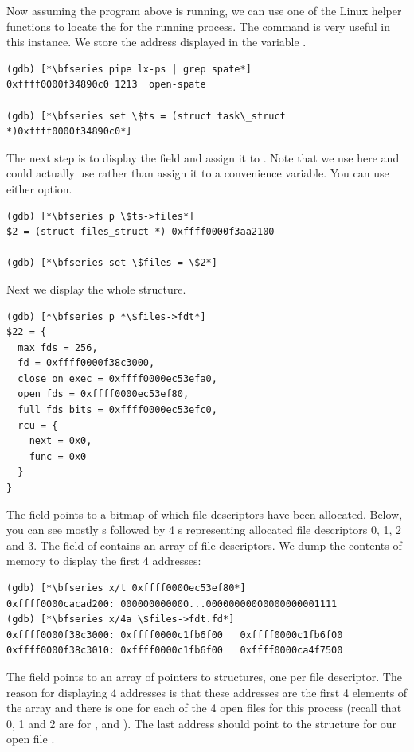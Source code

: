 Now assuming the program above is running, we can use one of the Linux helper functions to locate the  for the running process. The  command is very useful in this instance. We store the address displayed in the variable .

\begin{lstlisting}
(gdb) [*\bfseries pipe lx-ps | grep spate*]
0xffff0000f34890c0 1213  open-spate

(gdb) [*\bfseries set \$ts = (struct task\_struct *)0xffff0000f34890c0*]
\end{lstlisting}

\noindent
The next step is to display the  field and assign it to . Note that we use  here and could actually use  rather than assign it to a convenience variable. You can use either option.

\begin{lstlisting}
(gdb) [*\bfseries p \$ts->files*]
$2 = (struct files_struct *) 0xffff0000f3aa2100

(gdb) [*\bfseries set \$files = \$2*]
\end{lstlisting}

\noindent
Next we display the whole  structure. 

\begin{lstlisting}
(gdb) [*\bfseries p *\$files->fdt*]
$22 = {
  max_fds = 256,
  fd = 0xffff0000f38c3000,
  close_on_exec = 0xffff0000ec53efa0,
  open_fds = 0xffff0000ec53ef80,
  full_fds_bits = 0xffff0000ec53efc0,
  rcu = {
    next = 0x0,
    func = 0x0
  }
}
\end{lstlisting}

\noindent
The  field points to a bitmap of which file descriptors have been allocated. Below, you can see mostly s followed by 4 s representing allocated file descriptors 0, 1, 2 and 3. The  field of  contains an array of file descriptors.  We dump the contents of memory to display the first 4 addresses:

\begin{lstlisting}
(gdb) [*\bfseries x/t 0xffff0000ec53ef80*]
0xffff0000cacad200:	000000000000...00000000000000000001111
(gdb) [*\bfseries x/4a \$files->fdt.fd*]
0xffff0000f38c3000:	0xffff0000c1fb6f00   0xffff0000c1fb6f00
0xffff0000f38c3010:	0xffff0000c1fb6f00   0xffff0000ca4f7500
\end{lstlisting}

\noindent
The  field points to an array of pointers to  structures, one per file descriptor. The reason for displaying 4 addresses is that these addresses are the first 4 elements of the array and there is one for each of the 4 open files for this process (recall that 0, 1 and 2 are for ,  and ). The last address should point to the  structure for our open file . 

